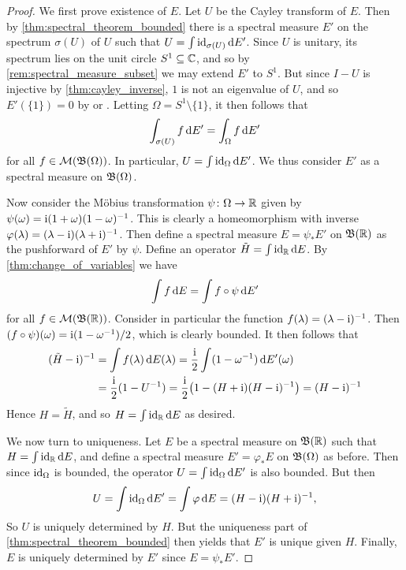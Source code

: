 \documentclass[article, a4paper, 11pt, oneside]{memoir}
\makeatletter
\let\phi\varphi
\numberwithin{equation}{chapter}
\theoremstyle{myexample}
\theoremstyle{myexample}
\theoremstyle{myexamplebreak}
\theoremstyle{myexamplebreak}
\theoremstyle{nonumberplain}
\newtheorem{proof}{\protect\@proof}
\theoremstyle{MyNonumberplain}
\newcommand{\@proof}{}
\renewcommand{\@proof}{Proof}%
\renewcommand{\@proof}{Bevis}%
\makeatother
\begin{document}
\begin{proof}
    We first prove existence of $E$. Let $U$ be the Cayley transform of $E$. Then by \cref{thm:spectral_theorem_bounded} there is a spectral measure $E'$ on the spectrum $\sigma(U)$ of $U$ such that $U = \int \operatorname{id}_{\sigma(U)} \mathop{}\!\mathrm{d} E'$. Since $U$ is unitary, its spectrum lies on the unit circle $S^1 \subseteq \mathbb{C}$, and so by \cref{rem:spectral_measure_subset} we may extend $E'$ to $S^1$. But since $I - U$ is injective by \cref{thm:cayley_inverse}, $1$ is not an eigenvalue of $U$, and so $E'(\{1\}) = 0$ by \textcite[Lemma~3.70]{skibsted2019} or \textcite[Theorem~12.29(b)]{rudinfunctional}. Letting $\Omega = S^1 \setminus \{1\}$, it then follows that
    \begin{equation*}
        \int_{\sigma(U)} f \mathop{}\!\mathrm{d} E'
            = \int_\Omega f \mathop{}\!\mathrm{d} E'
    \end{equation*}
    for all $f \in \mathcal{M}(\mathfrak{B}(\Omega))$. In particular, $U = \int \operatorname{id}_\Omega \mathop{}\!\mathrm{d} E'$. We thus consider $E'$ as a spectral measure on $\mathfrak{B}(\Omega)$.
    
    Now consider the Möbius transformation $\psi \colon \Omega \to \mathbb{R}$ given by $\psi(\omega) = \operatorname{i} (1+\omega)(1-\omega)^{-1}$. This is clearly a homeomorphism with inverse $\phi(\lambda) = (\lambda - \iu)(\lambda + \iu)^{-1}$. Then define a spectral measure $E = \psi_* E'$ on $\mathfrak{B}(\mathbb{R})$ as the pushforward of $E'$ by $\psi$. Define an operator $\tilde H = \int \operatorname{id}_{\mathbb{R}} \mathop{}\!\mathrm{d} E$. By \cref{thm:change_of_variables} we have
    \begin{equation*}
        \int f \mathop{}\!\mathrm{d} E = \int f \circ \psi \mathop{}\!\mathrm{d} E'
    \end{equation*}
    for all $f \in \mathcal{M}(\mathfrak{B}(\mathbb{R}))$. Consider in particular the function $f(\lambda) = (\lambda - \operatorname{i})^{-1}$. Then $(f \circ \psi)(\omega) = \operatorname{i} (1 - \omega^{-1}) /2$, which is clearly bounded. It then follows that
    \begin{align*}
        (\tilde H - \operatorname{i})^{-1}
            &=\int f(\lambda) \mathop{}\!\mathrm{d} E(\lambda)
             = \frac{\operatorname{i}}{2} \int (1 - \omega^{-1}) \mathop{}\!\mathrm{d} E'(\omega) \\
            &= \frac{\operatorname{i}}{2} (1 - U^{-1})
             = \frac{\operatorname{i}}{2} \big( 1 - (H + \operatorname{i})(H - \operatorname{i})^{-1} \big)
             = (H - \operatorname{i})^{-1}
    \end{align*}
    Hence $H = \tilde H$, and so $H = \int \operatorname{id}_{\mathbb{R}} \mathop{}\!\mathrm{d} E$ as desired.
    
    We now turn to uniqueness. Let $E$ be a spectral measure on $\mathfrak{B}(\mathbb{R})$ such that $H = \int \operatorname{id}_{\mathbb{R}} \mathop{}\!\mathrm{d} E$, and define a spectral measure $E' = \phi_* E$ on $\mathfrak{B}(\Omega)$ as before. Then since $\operatorname{id}_\Omega$ is bounded, the operator $U = \int \operatorname{id}_\Omega \mathop{}\!\mathrm{d} E'$ is also bounded. But then
    \begin{equation*}
        U
            = \int \id_\Omega \dif E'
            = \int \phi \dif E
            = (H - \iu)(H + \iu)^{-1},
    \end{equation*}
    So $U$ is uniquely determined by $H$. But the uniqueness part of \cref{thm:spectral_theorem_bounded} then yields that $E'$ is unique given $H$. Finally, $E$ is uniquely determined by $E'$ since $E = \psi_* E'$.
\end{proof}
\end{document}
